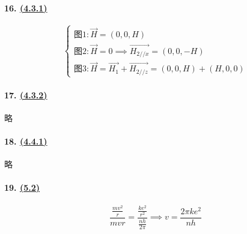 \paragraph{16. \hyperref[subsec:4.3.1]{(4.3.1)}}

\begin{equation*}
    \begin{cases}
        \textrm{图1}: \vec{H}=(0,0,H)\\
        \textrm{图2}: \vec{H}=0\implies \vec{H_{2//x}}=(0,0,-H)\\
        \textrm{图3}: \vec{H}=\vec{H_1}+\vec{H_{2//z}}=(0,0,H)+(H,0,0)
    \end{cases}
\end{equation*}

\paragraph{17. \hyperref[subsec:4.3.2]{(4.3.2)}} 略
\paragraph{18. \hyperref[subsec:4.4.1]{(4.4.1)}} 略
\paragraph{19. \hyperref[sec:5.2]{(5.2)}}

\begin{equation*}
    \frac{\frac{mv^2}{r}}{mvr}=\frac{\frac{ke^2}{r^2}}{\frac{nh}{2\pi}}\implies
    v=\frac{2\pi ke^2}{nh}
\end{equation*}
